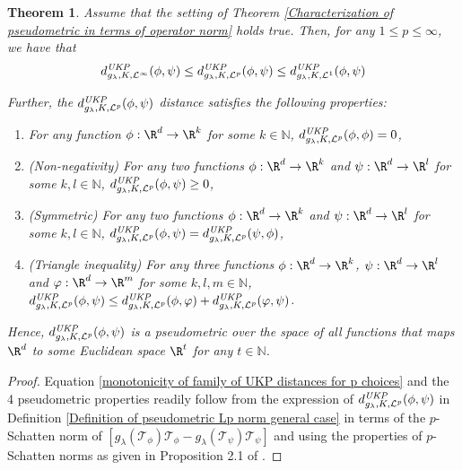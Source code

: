 \documentclass{article} %
\newcommand{\N}{\mathbb{N}}
\newcommand{\repone}{\phi}
\newcommand{\reptwo}{\psi}
\newcommand{\repthree}{\varphi}
\newcommand{\Tone}{\mathcal{T}_{\repone}}
\newcommand{\Ttwo}{\mathcal{T}_{\reptwo}}
\newcommand{\gl}{g_{\lambda}}
\newcommand{\metricstname}{UKP }
\newcommand{\dopgl}{d_{\gl,K,\mathcal{L}^{\infty}}^{\emph{\metricstname}}}
\newcommand{\donegl}{d_{\gl,K,\mathcal{L}^{1}}^{\emph{\metricstname}}}
\newcommand{\dLpgl}{d_{\gl,K,\mathcal{L}^{p}}^{\emph{\metricstname}}}
\theoremstyle{plain}
\newcounter{theoremno}
\newtheorem{theorem}[theoremno]{Theorem}
\begin{document}
\begin{theorem}\label{Theorem: Monotonicity and Pseudometricity}
    Assume that the setting of Theorem \ref{Characterization of pseudometric in terms of operator norm} holds true. Then, for any $1 \leq p \leq \infty$, we have that
    \begin{equation}
    \begin{aligned}\label{monotonicity of family of UKP distances for p choices}
        \dopgl(\repone,\reptwo) \leq \dLpgl(\repone,\reptwo) \leq \donegl(\repone, \reptwo)
    \end{aligned}
    \end{equation}
    
    Further, the $\dLpgl(\repone,\reptwo)$ distance satisfies the following properties:
    \begin{enumerate}
        \item For any function $\repone: \R^d \to \R^k$ for some $k \in \N$, $\dLpgl(\repone,\repone) = 0$,
        \item (Non-negativity) For any two functions $\repone: \R^d \to \R^k$ and $\reptwo: \R^d \to \R^l$ for some $k,l \in \N$, $\dLpgl(\repone,\reptwo) \geq 0$,
        \item (Symmetric) For any two functions $\repone: \R^d \to \R^k$ and $\reptwo: \R^d \to \R^l$ for some $k,l \in \N$, $\dLpgl(\repone,\reptwo) = \dLpgl(\reptwo,\repone)$,
        \item (Triangle inequality) For any three functions $\repone: \R^d \to \R^k$, $\reptwo: \R^d \to \R^l$ and $\repthree: \R^d \to \R^m$ for some $k,l,m \in \N$, $\dLpgl(\repone,\reptwo) \leq \dLpgl(\repone,\repthree) + \dLpgl(\repthree,\reptwo)$.
    \end{enumerate}
    Hence, $\dLpgl(\repone,\reptwo)$ is a pseudometric over the space of all functions that maps $\R^d$ to some Euclidean space $\R^t$ for any $t \in \N$.
\end{theorem}

\begin{proof}
    Equation \ref{monotonicity of family of UKP distances for p choices} and the 4 pseudometric properties readily
    follow from the expression of $\dLpgl(\repone,\reptwo)$ in Definition \ref{Definition of pseudometric Lp norm general case} in terms of the $p$-Schatten norm of $\left[\gl(\Tone) \Tone - \gl(\Ttwo) \Ttwo\right]$ and using the properties of $p$-Schatten norms as given in Proposition 2.1 of \citet{pfeiffer2021stability}.
\end{proof}
\end{document}

